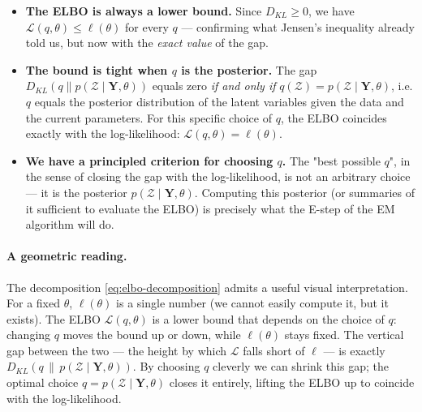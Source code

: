 \documentclass[11pt, a4paper, oneside]{article}
\newcommand{\mY}{\mathbf{Y}}
\begin{document}
\begin{itemize}[leftmargin=1.5em, itemsep=3pt]
    \item \textbf{The ELBO is always a lower bound.} Since
          $D_{KL} \geq 0$, we have
          $\mathcal{L}(q, \theta) \leq \ell(\theta)$ for every $q$ —
          confirming what Jensen's inequality already told us, but now
          with the \emph{exact value} of the gap.
    \item \textbf{The bound is tight when $q$ is the posterior.} The gap
          $D_{KL}(q \| p(\mathcal{Z} \mid \mY, \theta))$ equals zero
          \emph{if and only if} $q(\mathcal{Z}) = p(\mathcal{Z} \mid \mY, \theta)$,
          i.e. $q$ equals the posterior distribution of the latent
          variables given the data and the current parameters. For this
          specific choice of $q$, the ELBO coincides exactly with the
          log-likelihood: $\mathcal{L}(q, \theta) = \ell(\theta)$.
    \item \textbf{We have a principled criterion for choosing $q$.} The
          "best possible $q$", in the sense of closing the gap with the
          log-likelihood, is not an arbitrary choice — it is the
          posterior $p(\mathcal{Z} \mid \mY, \theta)$. Computing this
          posterior (or summaries of it sufficient to evaluate the
          ELBO) is precisely what the E-step of the EM algorithm will
          do.
\end{itemize}

\paragraph{A geometric reading.}
The decomposition \eqref{eq:elbo-decomposition} admits a useful
visual interpretation. For a fixed $\theta$, $\ell(\theta)$ is a
single number (we cannot easily compute it, but it exists). The ELBO
$\mathcal{L}(q, \theta)$ is a lower bound that depends on the choice
of $q$: changing $q$ moves the bound up or down, while $\ell(\theta)$
stays fixed. The vertical gap between the two — the height by which
$\mathcal{L}$ falls short of $\ell$ — is exactly
$D_{KL}(q \,\|\, p(\mathcal{Z} \mid \mY, \theta))$. By choosing $q$
cleverly we can shrink this gap; the optimal choice
$q = p(\mathcal{Z} \mid \mY, \theta)$ closes it entirely, lifting the
ELBO up to coincide with the log-likelihood.
\end{document}
